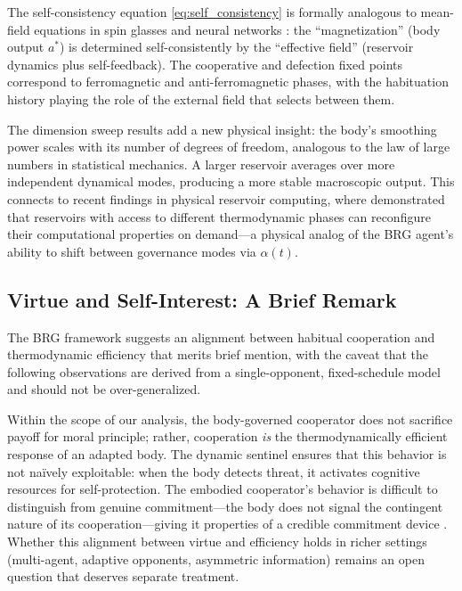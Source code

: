 \documentclass[11pt,a4paper]{article}
\theoremstyle{definition}
\begin{document}
The self-consistency equation \eqref{eq:self_consistency} is formally
analogous to mean-field equations in spin glasses and neural networks
\citep{ganguli2008}: the ``magnetization'' (body output $a^{*}$) is
determined self-consistently by the ``effective field'' (reservoir dynamics
plus self-feedback).  The cooperative and defection fixed points correspond
to ferromagnetic and anti-ferromagnetic phases, with the habituation
history playing the role of the external field that selects between them.

The dimension sweep results add a new physical insight: the body's
smoothing power scales with its number of degrees of freedom, analogous
to the law of large numbers in statistical mechanics.
A larger reservoir averages over more independent dynamical modes, producing
a more stable macroscopic output.  This connects to recent findings in
physical reservoir computing, where \citet{lee2024rc} demonstrated that
reservoirs with access to different thermodynamic phases can reconfigure
their computational properties on demand---a physical analog of the
BRG agent's ability to shift between governance modes via $\alpha(t)$.

\subsection{Virtue and Self-Interest: A Brief Remark}
\label{sec:virtue}

The BRG framework suggests an alignment between habitual cooperation and
thermodynamic efficiency that merits brief mention, with the caveat that
the following observations are derived from a single-opponent, fixed-schedule
model and should not be over-generalized.

Within the scope of our analysis, the body-governed cooperator
does not sacrifice payoff for moral principle; rather, cooperation
\emph{is} the thermodynamically efficient response of an adapted body.
The dynamic sentinel ensures that this behavior
is not na\"ively exploitable: when the body detects threat, it activates cognitive
resources for self-protection.
The embodied cooperator's behavior is difficult to distinguish
from genuine commitment---the body does not signal the contingent nature
of its cooperation---giving it properties of a credible commitment device
\citep{frank1988}.  Whether this alignment between virtue and efficiency
holds in richer settings (multi-agent, adaptive opponents, asymmetric
information) remains an open question that deserves separate treatment.
\end{document}
